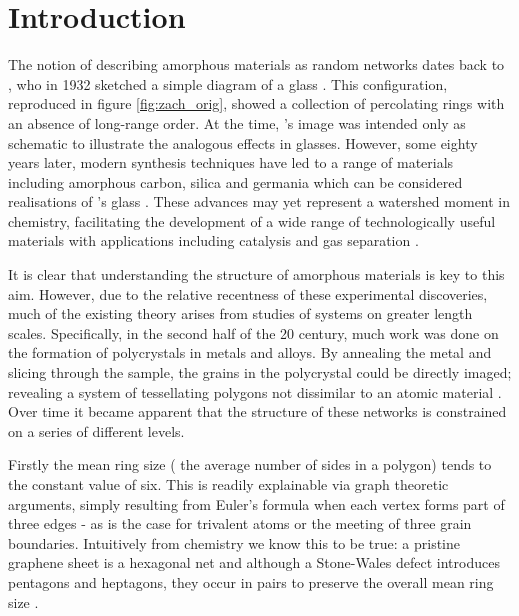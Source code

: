 \chapter{Introduction}
\label{ch:intro}


The notion of describing amorphous materials as random networks dates back to \zach, who in 1932 sketched a simple diagram of a \td{} glass \cite{Zachariasen1932}.
This configuration, reproduced in figure \ref{fig:zach_orig}, showed a collection of percolating rings with an absence of long\--range order.
At the time, \zach's image was intended only as schematic to illustrate the analogous effects in \thd{} glasses.
However, some eighty years later, modern synthesis techniques have led to a range of \td{} materials including amorphous carbon, silica and germania which can be considered realisations of \zach's glass \cite{Kotakoski2011,Robertson2012,Huang2012,Lichtenstein2012b,Lewandowski2018}.
These advances may yet represent a watershed moment in chemistry, facilitating the development of a wide range of technologically useful materials with applications including catalysis and gas separation \cite{Trogadas2014,Sun2015a,Buchner2017}.

It is clear that understanding the structure of amorphous materials is key to this aim.
However, due to the relative recentness of these experimental discoveries, much of the existing theory arises from studies of systems on greater length scales.
Specifically, in the second half of the 20\th{} century, much work was done on the formation of polycrystals in metals and alloys.
By annealing the metal and slicing through the sample, the grains in the polycrystal could be directly imaged; revealing a system of tessellating polygons not dissimilar to an atomic material \cite{Beck1954,Dunn1957}.
Over time it became apparent that the structure of these networks is constrained on a series of different levels.

Firstly the mean ring size (\ie{} the average number of sides in a polygon) tends to the constant value of six.
This is readily explainable via graph theoretic arguments, simply resulting from Euler's formula when each vertex forms part of three edges - as is the case for trivalent atoms or the meeting of three grain boundaries.
Intuitively from chemistry we know this to be true: a pristine graphene sheet is a hexagonal net and although a Stone\--Wales defect introduces pentagons and heptagons, they occur in pairs to preserve the overall mean ring size \cite{Stone1986}.

